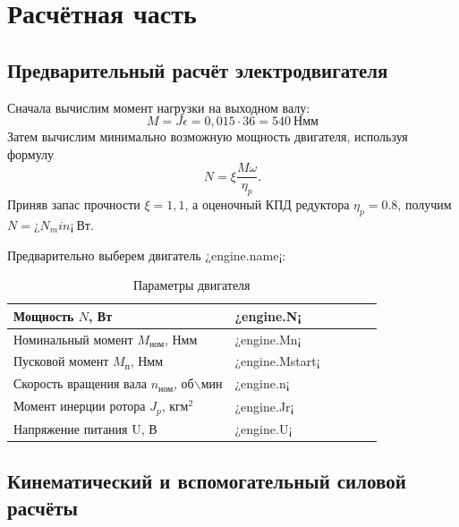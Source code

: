 \documentclass[14pt,a4paper,russian]{scrartcl}
\begin{document}
\newcommand{\Mnom}{M_{\text{ном}}}
\newcommand{\Mp}{M_{\text{п}}}
\newcommand{\nn}{n_{\text{ном}}}
\newcommand{\nv}{n_{\text{вых}}}

\setcounter{section}{1}
\section*{Расчётная часть}
\subsection{Предварительный расчёт электродвигателя}
    Сначала вычислим момент нагрузки на выходном валу:
    \[ M = J\epsilon = 0,015\cdot36 = 540\ \text{Нмм}\]
    Затем вычислим минимально возможную мощность двигателя, используя формулу
    \[ N = \xi\frac{M\omega}{\eta_p}. \]
    Приняв запас прочности \( \xi=1,1 \), а оценочный КПД редуктора \( \eta_p=0.8 \),
    получим \( N=¿N_min¡\ \text{Вт} \).

    Предварительно выберем двигатель ¿engine.name¡:
    \begin{table}[h!]
        \begin{center}
            \begin{tabular}{|p{0.6\linewidth}|p{0.4\linewidth}|}
                \hline
                Мощность \( N \), Вт & ¿engine.N¡ \\
                \hline
                Номинальный момент \( \Mnom \), Нмм & ¿engine.Mn¡ \\
                \hline
                Пусковой момент \( \Mp \), Нмм &    ¿engine.Mstart¡ \\
                \hline
                Скорость вращения вала \( \nn \), об\( \backslash \)мин     & ¿engine.n¡ \\
                \hline
                Момент инерции ротора \( J_p \), \( \text{кгм}^2 \) & ¿engine.Jr¡ \\
                \hline
                Напряжение питания U, В & ¿engine.U¡ \\
                \hline
            \end{tabular}
            \caption{Параметры двигателя}\label{tab:engine}
        \end{center}
    \end{table}

    \subsection{Кинематический и вспомогательный силовой расчёты}
\end{document}
